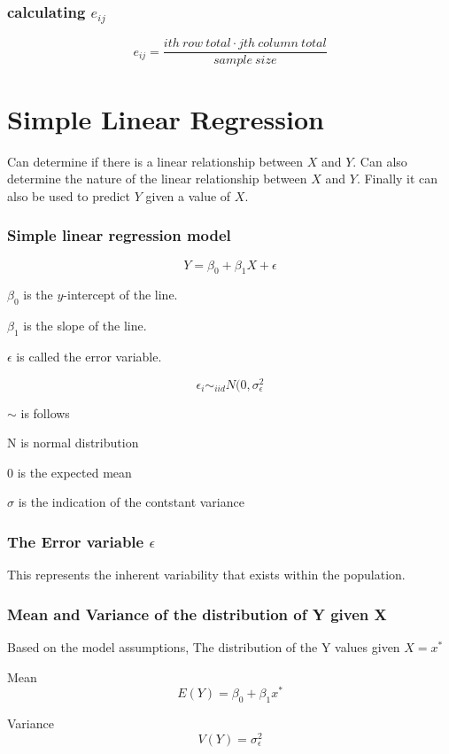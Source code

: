 \documentclass{article}
\begin{document}
\subsubsection{calculating $e_{ij}$}

$$
e_{ij} = \frac{ith\:row\:total \cdot jth\:column\:total}{sample\:size}
$$




\section{Simple Linear Regression}
Can determine if there is a linear relationship between $X$ and $Y$. Can also determine the nature of the linear relationship between $X$ and $Y$. Finally it can also be used to predict $Y$ given a value of $X$.

\subsubsection{Simple linear regression model}

$$
Y = \beta_0 + \beta_1 X + \epsilon
$$

$\beta_0$ is the $y$-intercept of the line.

$\beta_1$ is the slope of the line.

$\epsilon$ is called the error variable.



$$
\epsilon_i \sim_{iid} N(0, \sigma^2_\epsilon
$$

$\sim$ is follows

N is normal distribution

0 is the expected mean

$\sigma$ is the indication of the contstant variance


\subsubsection{The Error variable $\epsilon$}
This represents the inherent variability that exists within the population.

\subsubsection{Mean and Variance of the distribution of Y given X}
Based on the model assumptions, The distribution of the Y values given $X = x^*$

Mean
$$
E(Y) = \beta_0 + \beta_1 x^*
$$

Variance
$$
V(Y) = \sigma^2_\epsilon
$$
\end{document}
